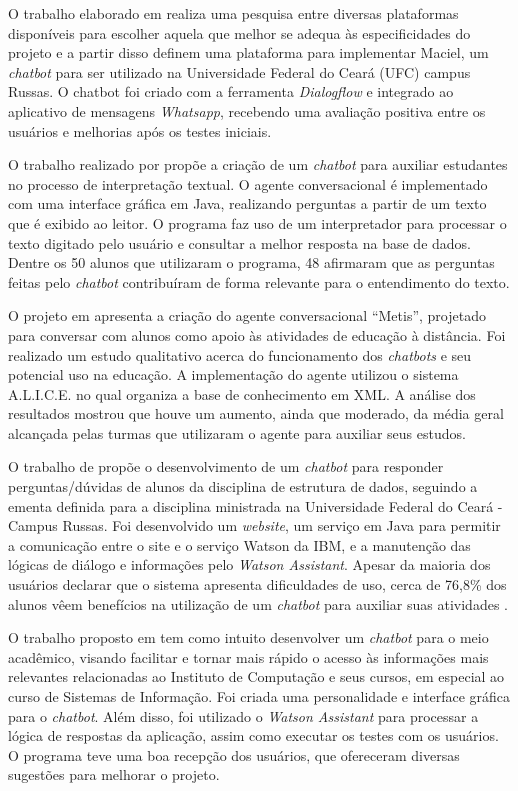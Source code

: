 \documentclass[12pt]{article}
\begin{document}
O trabalho elaborado em \cite{maciel:19} realiza uma pesquisa entre diversas plataformas disponíveis para escolher aquela que melhor se adequa às especificidades do projeto e a partir disso definem uma plataforma para implementar Maciel, um {\itshape chatbot} para ser utilizado na Universidade Federal do Ceará (UFC) campus Russas. O chatbot foi criado com a ferramenta {\itshape Dialogflow} e integrado ao aplicativo de mensagens {\itshape Whatsapp}, recebendo uma avaliação positiva entre os usuários e melhorias após os testes iniciais.

O trabalho realizado por \cite{bulhoes:20} propõe a criação de um {\itshape chatbot} para auxiliar estudantes no processo de interpretação textual. O agente conversacional é implementado com uma interface gráfica em Java, realizando perguntas a partir de um texto que é exibido ao leitor. O programa faz uso de um interpretador para processar o texto digitado pelo usuário e consultar a melhor resposta na base de dados. Dentre os 50 alunos que utilizaram o programa, 48 afirmaram que as perguntas feitas pelo {\itshape chatbot} contribuíram de forma relevante para o entendimento do texto.


O projeto em \cite{lucchesi:18} apresenta a criação do agente conversacional “Metis”, projetado para conversar com alunos como apoio às atividades de educação à distância. Foi realizado um estudo qualitativo acerca do funcionamento dos {\itshape chatbots} e seu potencial uso na educação. A implementação do agente utilizou o sistema A.L.I.C.E. no qual organiza a base de conhecimento em XML. A análise dos resultados mostrou que houve um aumento, ainda que moderado, da média geral alcançada pelas turmas que utilizaram o agente para auxiliar seus estudos.

O trabalho de \cite{araujo:20} propõe o desenvolvimento de um {\itshape chatbot} para responder perguntas/dúvidas de alunos da disciplina de estrutura de dados, seguindo a ementa definida para a disciplina ministrada na Universidade Federal do Ceará - Campus Russas. Foi desenvolvido um {\itshape website}, um serviço em Java para permitir a comunicação entre o site e o serviço Watson da IBM, e a manutenção das lógicas de diálogo e informações pelo {\itshape Watson Assistant}. Apesar da maioria dos usuários declarar que o sistema apresenta dificuldades de uso, cerca de 76,8\% dos alunos  vêem benefícios na utilização de um {\itshape chatbot} para auxiliar suas atividades   .

O trabalho proposto em \cite{catbot:19} tem como intuito desenvolver um {\itshape chatbot} para o meio acadêmico, visando facilitar e tornar mais rápido o acesso às informações mais relevantes relacionadas ao Instituto de Computação e seus cursos, em especial ao curso de Sistemas de Informação. Foi criada uma personalidade e interface gráfica para o {\itshape chatbot}. Além disso, foi utilizado o {\itshape Watson Assistant} para processar a lógica de respostas da aplicação, assim como executar os testes com os usuários. O programa teve uma boa recepção dos usuários, que ofereceram diversas sugestões para melhorar o projeto.
\end{document}
